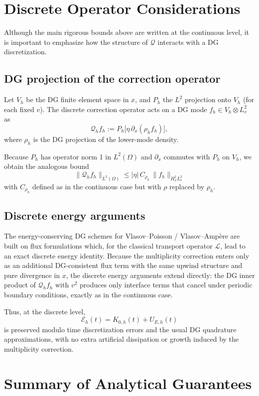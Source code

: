 \documentclass[11pt]{article}
\begin{document}
\section{Discrete Operator Considerations}

Although the main rigorous bounds above are written at the continuous level,
it is important to emphasize how the structure of $\mathcal{Q}$ interacts with
a DG discretization.

\subsection{DG projection of the correction operator}

Let $V_h$ be the DG finite element space in $x$, and $P_h$ the $L^2$
projection onto $V_h$ (for each fixed $v$). The discrete correction operator
acts on a DG mode $f_h \in V_h \otimes L^2_v$ as
\[
  \mathcal{Q}_h f_h := P_h\big[\eta\,\partial_x(\rho_h f_h)\big],
\]
where $\rho_h$ is the DG projection of the lower-mode density.

Because $P_h$ has operator norm 1 in $L^2(\Omega)$ and $\partial_x$ commutes
with $P_h$ on $V_h$, we obtain the analogous bound
\[
  \|\mathcal{Q}_h f_h\|_{L^2(\Omega)}
  \le |\eta|\,C_{\rho_h}\,\|f_h\|_{H^1_x L^2_v}
\]
with $C_{\rho_h}$ defined as in the continuous case but with $\rho$ replaced
by $\rho_h$.

\subsection{Discrete energy arguments}

The energy-conserving DG schemes for Vlasov--Poisson / Vlasov--Amp\`ere are
built on flux formulations which, for the classical transport operator
$\mathcal{L}$, lead to an exact discrete energy identity. Because the
multiplicity correction enters only as an additional DG-consistent flux term
with the same upwind structure and pure divergence in $x$, the discrete energy
arguments extend directly: the DG inner product of $\mathcal{Q}_h f_h$ with
$v^2$ produces only interface terms that cancel under periodic boundary
conditions, exactly as in the continuous case.

Thus, at the discrete level,
\[
  \mathcal{E}_h(t) = K_{0,h}(t) + U_{E,h}(t)
\]
is preserved modulo time discretization errors and the usual DG quadrature
approximations, with no extra artificial dissipation or growth induced by the
multiplicity correction.

\section{Summary of Analytical Guarantees}
\end{document}
